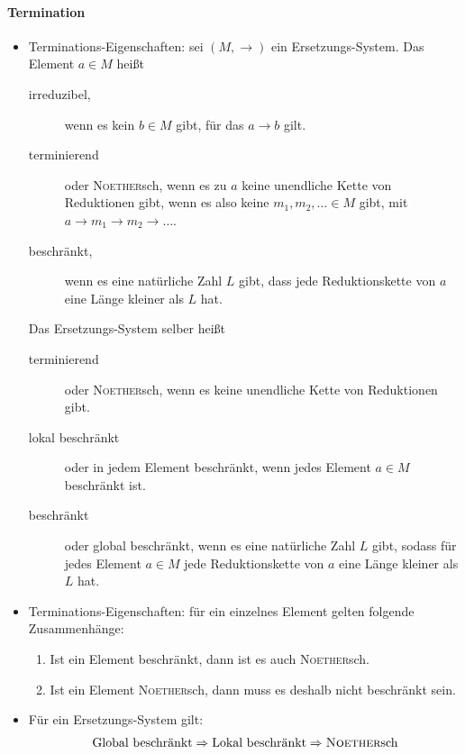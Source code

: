 \documentclass[
  a4paper,
  11pt,
]{scrartcl}
\begin{document}
\paragraph{Termination}
\label{par:termination}

\begin{itemize}
  \item Terminations-Eigenschaften: sei $(M, \rightarrow)$ ein
    Ersetzungs-System. Das Element $a \in M$ heißt
    \begin{description}
      \item[irreduzibel,]  wenn es kein $b \in M$ gibt, für das $a \rightarrow
        b$ gilt.
      \item[terminierend] oder \textsc{Noether}sch, wenn es zu $a$ keine
        unendliche Kette von Reduktionen gibt, wenn es also keine $m_1, m_2,
        \dots \in M$ gibt, mit $a \rightarrow m_1 \rightarrow m_2 \rightarrow
        \dots$.
      \item[beschränkt,] wenn es eine natürliche Zahl $L$ gibt, dass jede
        Reduktionskette von $a$ eine Länge kleiner als $L$ hat.
    \end{description}

    Das Ersetzungs-System selber heißt
    \begin{description}
      \item[terminierend] oder \textsc{Noether}sch, wenn es keine unendliche
        Kette von Reduktionen gibt.
      \item[lokal beschränkt] oder in jedem Element beschränkt, wenn jedes
        Element $a \in M$ beschränkt ist.
      \item[beschränkt] oder global beschränkt, wenn es eine natürliche Zahl $L$
        gibt, sodass für jedes Element $a \in M$ jede Reduktionskette von $a$
        eine Länge kleiner als $L$ hat.
    \end{description}

  \item Terminations-Eigenschaften: für ein einzelnes Element gelten folgende
    Zusammenhänge:
    \begin{enumerate}
      \item Ist ein Element beschränkt, dann ist es auch \textsc{Noether}sch.
      \item Ist ein Element \textsc{Noether}sch, dann muss es deshalb nicht
        beschränkt sein.
    \end{enumerate}

  \item Für ein Ersetzungs-System gilt:
    \begin{align*}
      \text{Global beschränkt} \Rightarrow \text{Lokal beschränkt} \Rightarrow
      \textsc{Noether}\text{sch}
    \end{align*}


\end{itemize}
\end{document}
